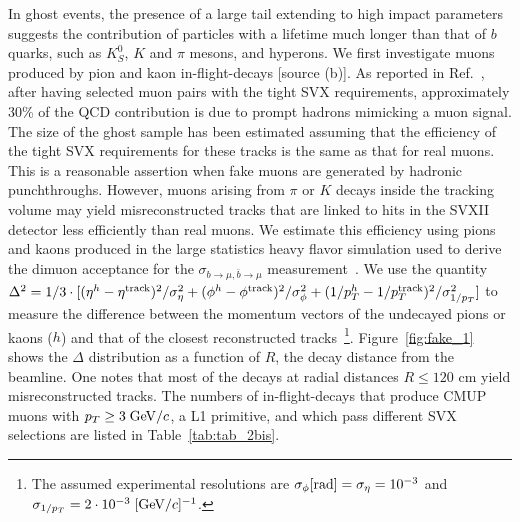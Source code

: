 \documentclass[aps,prd,preprint,floatfix,nofootinbib,superscriptaddress,showpacs,amssymb]{revtex4}
\begin{document}
 In ghost events, the presence of a large tail extending to high impact
 parameters suggests the contribution of particles with a lifetime much
 longer than that of $b$ quarks, such as $K^0_S$, $K$ and  $\pi$ mesons,
 and hyperons. We first investigate muons produced by pion and kaon
 in-flight-decays [source  (b)]. As reported in Ref.~\cite{bbxs}, after having selected
 muon pairs with the tight SVX requirements, approximately 30\% of the QCD
 contribution is due to prompt hadrons mimicking a muon signal.
 The size of the ghost sample has been estimated assuming that the
 efficiency of the tight SVX requirements for these tracks is the same as 
 that for real muons. This is a reasonable assertion when fake muons are
 generated by hadronic punchthroughs. However, muons arising from $\pi$ 
 or $K$ decays inside the tracking volume may yield misreconstructed tracks
 that are linked to hits in the SVXII detector less efficiently than real 
 muons. We estimate this efficiency using pions and kaons
 produced in the large statistics heavy flavor simulation used to derive 
 the dimuon acceptance for the $\sigma_{b\rightarrow\mu,\bar{b}\rightarrow\mu}$
 measurement~\cite{bbxs}. We use the quantity
  $\Delta^2 =1/3 \cdot [(\eta^h- \eta^{\rm track})^2/\sigma_{\eta}^2+
                        (\phi^h-\phi^{\rm track})^2/\sigma_{\phi}^2+
                        (1/p_T^h -1/p_T^{\rm track})^2/\sigma_{1/p_T}^2]$
 to measure the difference between the momentum vectors of the undecayed
 pions or kaons ($h$) and that of the closest reconstructed tracks~\footnote{
 The assumed experimental resolutions are 
     $\sigma_{\phi} [{\rm rad}] = \sigma_{\eta}=10^{-3}$ 
 and $\sigma_{1/p_T}=2\cdot 10^{-3}\; [{\rm GeV/}c]^{-1}$. }.
 Figure~\ref{fig:fake_1} shows the $\Delta$ distribution as a function of $R$,
 the decay distance from the beamline. One notes that most of the decays 
  at radial distances $R \leq 120$ cm yield misreconstructed tracks.
 The numbers of in-flight-decays that produce CMUP muons with 
 $p_T \geq 3\; {\rm GeV/}c$, a L1 primitive, and which pass different SVX selections
 are listed in Table~\ref{tab:tab_2bis}.
\end{document}
